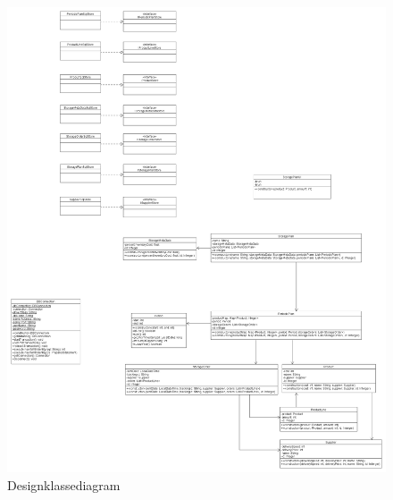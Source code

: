 \begin{landscape}
    \begin{figure}
        \centering
        \includegraphics[width=0.9\hsize]{figures/design/designclassdiagram.png}
        \caption{Designklassediagram}
        \label{fig:designklassediagram}
\end{figure}
\end{landscape}

